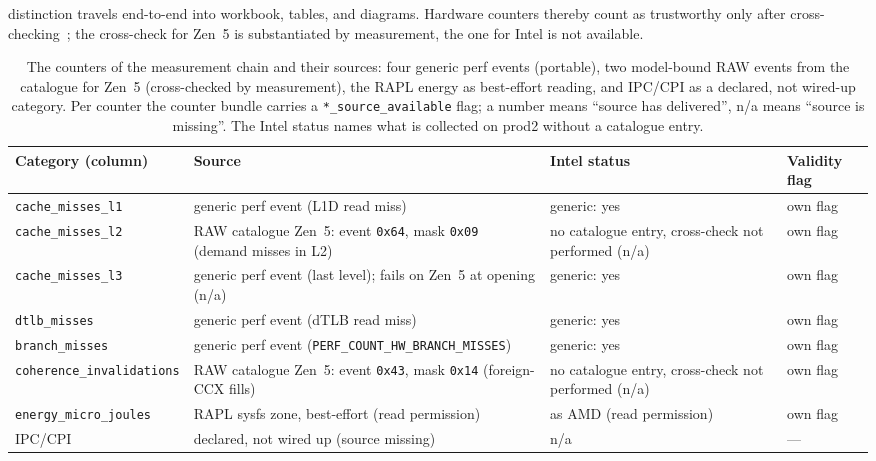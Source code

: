 \begin{nurlang}
distinction travels end-to-end into workbook, tables, and diagrams. Hardware counters thereby count
as trustworthy only after cross-checking~\cite{weaver2008counters}; the cross-check for Zen~5 is
substantiated by measurement, the one for Intel is not available.
\begin{table}[htbp]\centering\footnotesize
\begin{tabular}{@{}l>{\raggedright\arraybackslash}p{4.6cm}>{\raggedright\arraybackslash}p{3.2cm}>{\raggedright\arraybackslash}p{2.3cm}@{}}
\toprule
Category (column) & Source & Intel status & Validity flag \\
\midrule
\texttt{cache\_misses\_l1} & generic perf event (L1D read miss) & generic: yes & own flag \\
\texttt{cache\_misses\_l2} & RAW catalogue Zen~5: event \texttt{0x64}, mask \texttt{0x09} (demand misses in L2) & no catalogue entry, cross-check not performed (n/a) & own flag \\ %
\texttt{cache\_misses\_l3} & generic perf event (last level); fails on Zen~5 at opening (n/a) & generic: yes & own flag \\
\texttt{dtlb\_misses} & generic perf event (dTLB read miss) & generic: yes & own flag \\
\texttt{branch\_misses} & generic perf event (\texttt{PERF\_COUNT\_\allowbreak{}HW\_\allowbreak{}BRANCH\_\allowbreak{}MISSES}) & generic: yes & own flag \\
\texttt{coherence\_invalidations} & RAW catalogue Zen~5: event \texttt{0x43}, mask \texttt{0x14} (foreign-CCX fills) & no catalogue entry, cross-check not performed (n/a) & own flag \\ %
\texttt{energy\_micro\_joules} & RAPL sysfs zone, best-effort (read permission) & as AMD (read permission) & own flag \\
IPC/CPI & declared, not wired up (source missing) & n/a & --- \\
\bottomrule
\end{tabular}
\caption{The counters of the measurement chain and their sources: four generic perf events
(portable), two model-bound RAW events from the catalogue for Zen~5 (cross-checked by measurement),
the RAPL energy as best-effort reading, and IPC/CPI as a declared, not wired-up category. Per counter
the counter bundle carries a \texttt{*\_source\_available} flag; a number means \enquote{source has
delivered}, n/a means \enquote{source is missing}. The Intel status names what is collected on prod2
without a catalogue entry.}\label{tab:eval-pmc-zaehler}
\end{table}
\end{nurlang}
